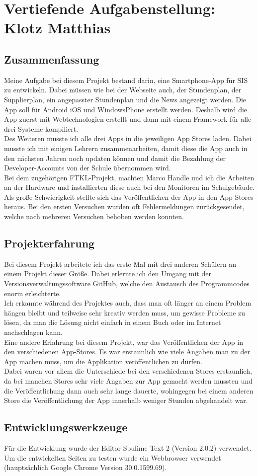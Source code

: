 \chapter[Klotz]{Vertiefende Aufgabenstellung: \\Klotz Matthias}

\section{Zusammenfassung}
Meine Aufgabe bei diesem Projekt bestand darin, eine Smartphone-App für SIS zu entwickeln. Dabei müssen wie bei der Webseite auch, der Stundenplan, der Supplierplan, ein angepasster Stundenplan und die News angezeigt werden. Die App soll für Android iOS und WindowsPhone erstellt werden. Deshalb wird die App zuerst mit Webtechnologien erstellt und dann mit einem Framework für alle drei Systeme kompiliert.\\
Des Weiteren musste ich alle drei Apps in die jeweiligen App Stores laden. Dabei musste ich mit einigen Lehrern zusammenarbeiten, damit diese die App auch in den nächsten Jahren noch updaten können und damit die Bezahlung der Developer-Accounts von der Schule übernommen wird.\\
Bei dem zugehörigen FTKL-Projekt, machten Marco Handle und ich die Arbeiten an der Hardware und installierten diese auch bei den Monitoren im Schulgebäude.\\
Als große Schwierigkeit stellte sich das Veröffentlichen der App in den App-Stores heraus. Bei den ersten Versuchen wurden oft Fehlermeldungen zurückgesendet, welche nach mehreren Versuchen behoben werden konnten. \\

\section{Projekterfahrung}
Bei diesem Projekt arbeitete ich das erste Mal mit drei anderen Schülern an einem Projekt dieser Größe. Dabei erlernte ich den Umgang mit der Versionsverwaltungssoftware GitHub, welche den Austausch des Programmcodes enorm erleichterte.\\
Ich erkannte während des Projektes auch, dass man oft länger an einem Problem hängen bleibt und teilweise sehr kreativ werden muss, um gewisse Probleme zu lösen, da man die Lösung nicht einfach in einem Buch oder im Internet nachschlagen kann.\\
Eine andere Erfahrung bei diesem Projekt, war das Veröffentlichen der App in den verschiedenen App-Stores. Es war erstaunlich wie viele Angaben man zu der App machen muss, um die Applikation veröffentlichen zu dürfen.\\
Dabei waren vor allem die Unterschiede bei den verschiedenen Stores erstaunlich, da bei manchen Stores sehr viele Angaben zur App gemacht werden mussten und die Veröffentlichung dann auch sehr lange dauerte, wohingegen bei einem anderen Store die Veröffentlichung der App innerhalb weniger Stunden abgehandelt war.\\

\section{Entwicklungswerkzeuge}
Für die Entwicklung wurde der Editor Sbulime Text 2 (Version 2.0.2) verwendet. Um die entwickelten Seiten zu testen wurde ein Webbrowser verwendet (hauptsächlich Google Chrome Version 30.0.1599.69).